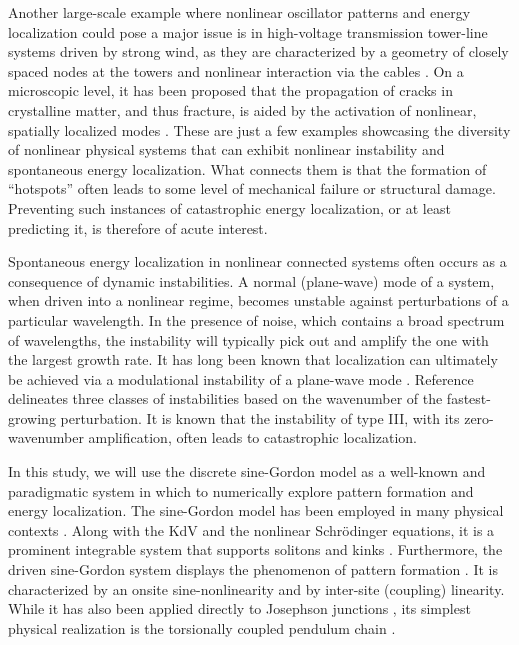 \documentclass[11pt]{article}
\begin{document}
Another large-scale example where nonlinear oscillator patterns and energy localization could pose a major issue is in high-voltage transmission tower-line systems driven by strong wind, as they are characterized by a geometry of closely spaced nodes at the towers and nonlinear interaction via the cables \cite{zhang2017wind}. On a microscopic level, it has been proposed that the propagation of cracks in crystalline matter, and thus fracture, is aided by the activation of nonlinear, spatially localized modes \cite{sharon2001propagating,zhou1997nonlinear}.
%
These are just a few examples showcasing the diversity of nonlinear physical systems that can exhibit nonlinear instability and spontaneous energy localization. What connects them is that the formation of ``hotspots'' often leads to some level of mechanical failure or structural damage. Preventing such instances of catastrophic energy localization, or at least predicting it, is therefore of acute interest.

Spontaneous energy localization in nonlinear connected systems often occurs as a consequence of dynamic instabilities. A normal (plane-wave) mode of a system, when driven into a nonlinear regime, becomes unstable against perturbations of a particular wavelength. In the presence of noise, which contains a broad spectrum of wavelengths, the instability will typically pick out and amplify the one with the largest growth rate. It has long been known that localization can ultimately be achieved via a modulational instability of a plane-wave mode \cite{kivshar1993creation, extreme}.
Reference \cite{cross1993pattern} delineates three classes of instabilities based on the wavenumber of the fastest-growing perturbation. It is known that the instability of type III, with its zero-wavenumber amplification, often leads to catastrophic localization.

In this study, we will use the discrete sine-Gordon model as a well-known and paradigmatic system in which to numerically explore pattern formation and energy localization. The sine-Gordon model has been employed in many physical contexts \cite{cuevas2014sine}. Along with the KdV and the nonlinear Schr\"odinger equations, it is a prominent integrable system that supports solitons and kinks \cite{helal2002soliton, kivshar1989dynamics}. Furthermore, the driven sine-Gordon system displays the phenomenon of pattern formation \cite{ferre2017localized}. It is characterized by an onsite sine-nonlinearity and by inter-site (coupling) linearity. While it has also been applied directly to Josephson junctions \cite{lomdahl1985solitons, cuevas2014sine}, its simplest physical realization is the torsionally coupled pendulum chain \cite{thakur2007driven}.
\end{document}
